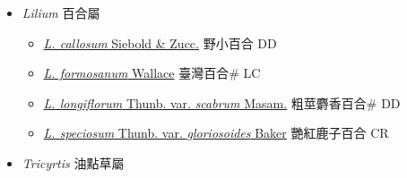 
  \begin{itemize}
 \item[] \textit{Lilium} 百合屬
                    
  \begin{itemize}
        \item[] \href{http://www.theplantlist.org/tpl1.1/search?q=Lilium+callosum}{\textit{L. callosum} Siebold \& Zucc.}     野小百合 DD
        \item[] \href{http://www.theplantlist.org/tpl1.1/search?q=Lilium+formosanum}{\textit{L. formosanum} Wallace}   臺灣百合\# LC
        \item[] \href{http://www.theplantlist.org/tpl1.1/search?q=Lilium+longiflorum+var.+scabrum}{\textit{L. longiflorum} Thunb. var. \textit{scabrum} Masam.}   粗莖麝香百合\# DD
        \item[] \href{http://www.theplantlist.org/tpl1.1/search?q=Lilium+speciosum+var.+gloriosoides}{\textit{L. speciosum} Thunb. var. \textit{gloriosoides} Baker}   艷紅鹿子百合 CR
  \end{itemize}
 \item[] \textit{Tricyrtis} 油點草屬
                    

\end{itemize}
